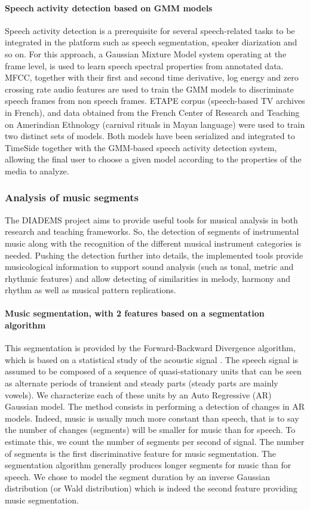 \documentclass{sig-alternate}
\newcommand{\squeezeup}{\vspace{-2.5mm}}
\begin{document}
\squeezeup\paragraph{Speech activity detection based on GMM models}
Speech activity detection is a prerequisite for several speech-related tasks to be integrated in the platform such as speech segmentation, speaker diarization and so on.
For this approach, a Gaussian Mixture Model system operating at the frame level, is used to learn speech spectral properties from annotated data.
MFCC, together with their first and second time derivative, log energy and zero crossing rate audio features are used to train the GMM models to discriminate speech frames from non speech frames.
ETAPE corpus \cite{gravier2012etape} (speech-based TV archives in French), and data obtained from the French Center of Research and Teaching on Amerindian Ethnology (carnival rituals in Mayan language) were used to train two distinct sets of models.
Both models have been serialized and integrated to TimeSide together with the GMM-based speech activity detection system, allowing the final user to choose a given model according to the properties of the media to analyze.

\subsubsection{Analysis of music segments}
The DIADEMS project aims to provide useful tools for musical analysis in both research and teaching frameworks. So, the detection of segments of instrumental music along with the recognition of the different musical instrument categories is needed. Pushing the detection further into details, the implemented tools provide musicological information to support sound analysis (such as tonal, metric and rhythmic features) and allow detecting of similarities in melody, harmony and rhythm as well as musical pattern replications.

\squeezeup\paragraph{Music segmentation, with 2 features based on a segmentation algorithm} 
This segmentation is provided by the Forward-Backward Divergence algorithm, which is based on a statistical study of the acoustic signal \cite{Obrecht1988}. The speech signal is assumed to be composed of a sequence of quasi-stationary units that can be seen as alternate periods of transient and steady parts (steady parts are mainly vowels). We characterize  each of these units by an Auto Regressive (AR) Gaussian model. The method consists in performing a detection of changes in AR models. Indeed, music is usually much more constant than speech, that is to say the number of changes (segments) will be smaller for music than for speech. To estimate this, we count the number of segments per second of signal. The number of segments is the first discriminative feature for music segmentation.
The segmentation algorithm  generally produces longer segments for music than for speech. We chose to model the segment duration by an inverse Gaussian distribution (or Wald distribution) which is indeed the second feature providing music segmentation.
\end{document}
